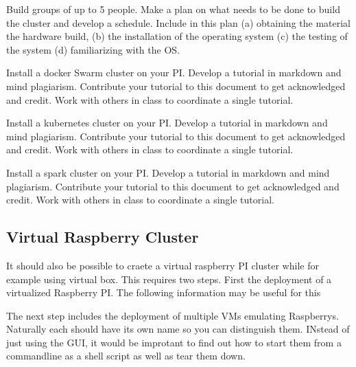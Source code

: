 \begin{exercise}

\label{E:.Pi.Cluster.Build} Build groups of up to 5 people. Make a
  plan on what needs to be done to build the cluster and develop a
  schedule. Include in this plan (a) obtaining the material the
  hardware build, (b) the installation of the operating system (c) the
  testing of the system (d) familiarizing with the OS.
\end{exercise}

\begin{exercise}

  \label{E:.Pi.Cluster.DockerSwarm} Install a docker Swarm cluster on
  your PI. Develop a tutorial in markdown and mind
  plagiarism. Contribute your tutorial to this document to get
  acknowledged and credit. Work with others in class to coordinate a
  single tutorial.
\end{exercise}

\begin{exercise}

  \label{E:.Pi.Cluster.Kubernetes} Install a kubernetes cluster on
  your PI. Develop a tutorial in markdown and mind
  plagiarism. Contribute your tutorial to this document to get
  acknowledged and credit. Work with others in class to coordinate a
  single tutorial.
\end{exercise}
  
\begin{exercise}
  \label{E:.Pi.Cluster.Spark} Install a spark cluster on your
  PI. Develop a tutorial in markdown and mind plagiarism. Contribute
  your tutorial to this document to get acknowledged and credit. Work
  with others in class to coordinate a single tutorial.
\end{exercise}


\subsection{Virtual Raspberry Cluster}

It should also be possible to craete a virtual raspberry PI cluster
while for example using virtual box. This requires two steps. First
the deployment of a virtualized Raspberry PI. The following
information may be useful for this


The next step includes the deployment of multiple VMs emulating
Raspberrys. Naturally each should have its own name so you can
distinguish them. INstead of just using the GUI, it would be improtant
to find out how to start them from a commandline as a shell script as
well as tear them down.

